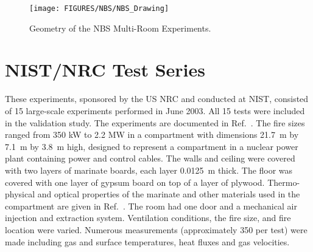 \begin{figure}
\begin{center}
\texttt{[image: FIGURES/NBS/NBS\_Drawing]}
\end{center}
\caption{Geometry of the NBS Multi-Room Experiments.}
\label{NBS_Drawing}
\end{figure}





\clearpage

\section{NIST/NRC Test Series}

These experiments, sponsored by the US NRC and conducted at NIST, consisted of 15 large-scale experiments performed in June 2003. All 15 tests were
included in the validation study. The experiments are documented in Ref.~\cite{Hamins:SP1013-1}. The fire sizes ranged from 350 kW to 2.2 MW in a compartment with dimensions
21.7~m by 7.1~m by 3.8~m high, designed to represent a compartment in a nuclear power plant containing power and control cables.
The walls and ceiling were covered with two layers of marinate boards, each layer 0.0125~m thick. The floor
was covered with one layer of gypsum board on top of a layer of plywood. Thermo-physical and optical properties of the marinate
and other materials used in the compartment are given in Ref.~\cite{Hamins:SP1013-1}. The room had one door and a mechanical air injection and extraction
system. Ventilation conditions, the fire size, and fire location were varied. Numerous measurements (approximately 350 per test) were made including
gas and surface temperatures, heat fluxes and gas velocities.


